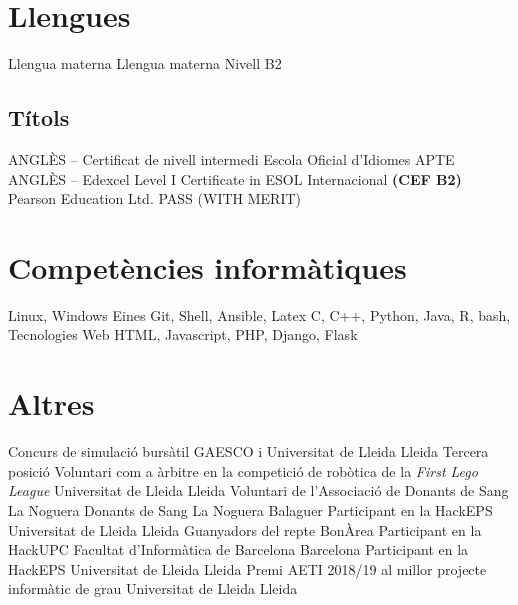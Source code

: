 \documentclass[a4paper,12pt,final]{moderncv}
\begin{document}
\section{Llengues}
	{Llengua materna}
	{}
	{Llengua materna}
	{}
	{Nivell B2}
	{}

\subsection{Títols}
	{ANGLÈS -- Certificat de nivell intermedi}
	{Escola Oficial d'Idiomes}
	{}
	{APTE}
	{}
	{ANGLÈS -- Edexcel Level I Certificate in ESOL Internacional
		\textbf{(CEF B2)}}
	{Pearson Education Ltd.}
	{}
	{PASS (WITH MERIT)}
	{}


\section{Competències informàtiques}
		{Linux, Windows}
	{Eines}
		{Git, Shell, Ansible, Latex}
		{C, C++, Python, Java, R, bash,}
	{Tecnologies Web}
		{HTML, Javascript, PHP, Django, Flask}

\section{Altres}
	{Concurs de simulació bursàtil}
	{GAESCO i Universitat de Lleida}
	{Lleida}
	{Tercera posició}
	{}
	{Voluntari com a àrbitre en la competició de robòtica de la
		\textit{First Lego League}}
	{Universitat de Lleida}
	{Lleida}
	{}
	{}
	{Voluntari de l'Associació de Donants de Sang La Noguera}
	{Donants de Sang La Noguera}
	{Balaguer}
	{}
	{}
	{Participant en la HackEPS}
	{Universitat de Lleida}
	{Lleida}
	{Guanyadors del repte BonÀrea}
	{}
	{Participant en la HackUPC}
	{Facultat d'Informàtica de Barcelona}
	{Barcelona}
	{}
	{}
	{Participant en la HackEPS}
	{Universitat de Lleida}
	{Lleida}
	{}
	{}
	{Premi AETI 2018/19 al millor projecte informàtic de grau}
	{Universitat de Lleida}
	{Lleida}
	{}
	{}
\end{document}
